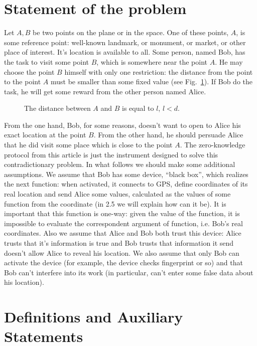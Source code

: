 \documentclass{article}
\begin{document}
\section{Statement of the problem}

Let $A, B$ be two points on the plane or in the space.
One of these points, $A$, is some reference point: well-known landmark, or monument, or market, or other place of interest.
It’s location is available to all.
Some person, named Bob, has the task to visit some point $B$, which is somewhere near the point $A$.
He may choose the point $B$ himself with only one restriction: the distance from the point      
to the point $A$ must be smaller than some fixed value (see Fig.~\ref{fig-1}).
If Bob do the task, he will get some reward from the other person named Alice.
\begin{figure}
  \centering
  \def\svgwidth{\columnwidth}
  
\caption{The distance between $A$ and $B$ is equal to $l$, $l < d$.}
\label{fig-1}
\end{figure}
%
From the one hand, Bob, for some reasons, doesn’t want to open to Alice his exact location at the point $B$.
From the other hand, he should persuade Alice that he did visit some place which is close to the point $A$.
The zero-knowledge protocol from this article is just the instrument designed to solve this contradictionary problem.
In what follows we should make some additional assumptions.
We assume that Bob has some device, “black box”, which realizes the next function: when activated, it connects to GPS,
define coordinates of its real location and send Alice some values, calculated as the values of some function from the coordinate (in 2.5 we will explain how can it be).
It is important that this function is one-way: given the value of the function, it is impossible to evaluate the correspondent argument of function, i.e. Bob’s real coordinates.
Also we assume that Alice and Bob both trust this device: Alice trusts that it’s information is true and Bob trusts that information it send doesn’t allow Alice to reveal his location.
We also assume that only Bob can activate the device (for example, the device checks fingerprint or so) and that Bob can’t interfere into its work (in particular,
can’t enter some false data about his location).

\section{Definitions and Auxiliary Statements}
\end{document}
